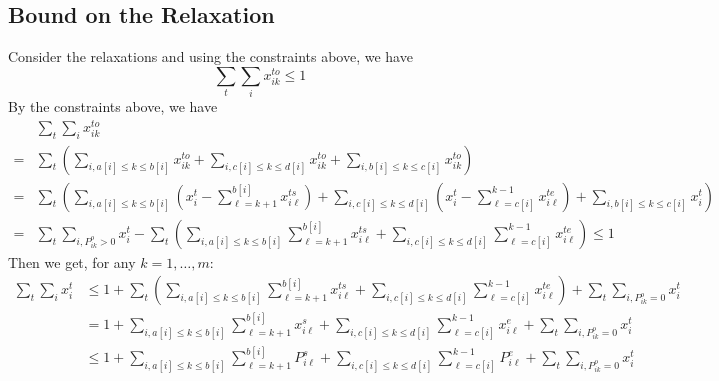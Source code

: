\documentclass{article}
\begin{document}
\subsection{Bound on the Relaxation}
Consider the relaxations and using the constraints above, we have 
\[\sum_{t}\sum_{i}x_{ik}^{to}\leq 1\]
By the constraints above, we have 
\begin{align*}
&\sum_{t}\sum_{i}x_{ik}^{to}\\
=&\sum_{t} \left(\sum_{i,a[i]\leq k\leq b[i]}x_{ik}^{to}+\sum_{i,c[i]\leq k\leq d[i]}x_{ik}^{to}+\sum_{i,b[i]\leq k\leq c[i]}x_{ik}^{to}\right)\\
=&\sum_{t} \left(\sum_{i,a[i]\leq k\leq b[i]}(x_{i}^{t}-\sum_{\ell = k+1}^{b[i]}x_{i\ell}^{ts})+\sum_{i,c[i]\leq k\leq d[i]}(x_i^t-\sum_{\ell =c[i]}^{k-1}x_{i\ell}^{te})+\sum_{i,b[i]\leq k\leq c[i]}x_{i}^{t}\right)\\
=&\sum_{t}\sum_{i, P_{ik}^o> 0} x_i^t-\sum_t \left(\sum_{i,a[i]\leq k\leq b[i]}\sum_{\ell = k+1}^{b[i]}x_{i\ell}^{ts}+\sum_{i,c[i]\leq k\leq d[i]}\sum_{\ell =c[i]}^{k-1}x_{i\ell}^{te}\right)\leq 1
\end{align*}
Then we get, for any $k = 1,\ldots, m$:
\begin{align*}
   \sum_{t}\sum_{i} x_i^t &\leq 1 + \sum_t \left(\sum_{i,a[i]\leq k\leq b[i]}\sum_{\ell = k+1}^{b[i]}x_{i\ell}^{ts}+\sum_{i,c[i]\leq k\leq d[i]}\sum_{\ell =c[i]}^{k-1}x_{i\ell}^{te}\right)+\sum_{t}\sum_{i, P_{ik}^o = 0} x_i^t\\
   &= 1+\sum_{i,a[i]\leq k\leq b[i]}\sum_{\ell = k+1}^{b[i]}x_{i\ell}^{s}+\sum_{i,c[i]\leq k\leq d[i]}\sum_{\ell =c[i]}^{k-1}x_{i\ell}^{e}+\sum_{t}\sum_{i, P_{ik}^o = 0} x_i^t\\
   &\leq 1+\sum_{i,a[i]\leq k\leq b[i]}\sum_{\ell = k+1}^{b[i]}P_{i\ell}^{s}+\sum_{i,c[i]\leq k\leq d[i]}\sum_{\ell =c[i]}^{k-1}P_{i\ell}^{e}+\sum_{t}\sum_{i, P_{ik}^o = 0} x_i^t
\end{align*}
\end{document}
